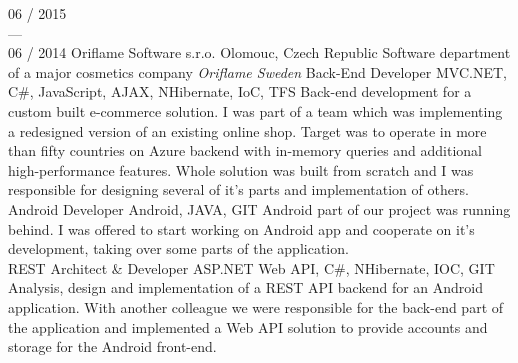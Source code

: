 \documentclass[]{friggeri-cv} %
\begin{document}
\begin{entrylist}
  \job
  {06 / 2015 \\ --- \\ 06 / 2014}
  {Oriflame Software s.r.o.}
  {Olomouc, Czech Republic}
  {Software department of a major cosmetics company \emph{Oriflame Sweden}}
  {
    \position
    {Back-End Developer}
    {MVC.NET, C\#, JavaScript, AJAX, NHibernate, IoC, TFS}
    {Back-end development for a custom built e-commerce solution.
    I was part of a team which was implementing a redesigned version of an existing online shop.
    Target was to operate in more than fifty countries on Azure backend with in-memory queries and additional high-performance features.
    Whole solution was built from scratch and I was responsible for designing several of it's parts and implementation of others.}\\
    \position
    {Android Developer}
    {Android, JAVA, GIT}
    {Android part of our project was running behind.
    I was offered to start working on Android app and cooperate on it's development, taking over some parts of the application.}\\
    \position
    {REST Architect \& Developer}
    {ASP.NET Web API, C\#, NHibernate, IOC, GIT}
    {Analysis, design and implementation of a REST API backend for an Android application.
    With another colleague we were responsible for the back-end part of the application and implemented a Web API solution to provide
    accounts and storage for the Android front-end.}%
  }
\end{entrylist}
\end{document}
